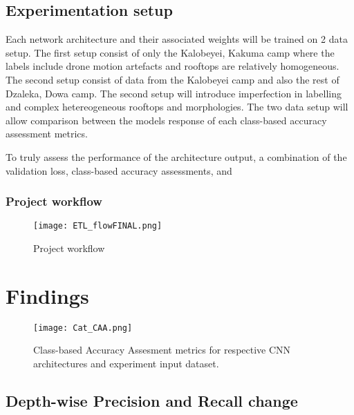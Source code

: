 \documentclass[11pt, a4paper, twoside]{report}
\begin{document}
\section{Experimentation setup}\label{ExpSetup}

Each network architecture and their associated weights will be trained on 2 data setup. The first setup consist of only the Kalobeyei, Kakuma camp where the labels include drone motion artefacts and rooftops are relatively homogeneous. The second setup consist of data from the Kalobeyei camp and also the rest of Dzaleka, Dowa camp. The second setup will introduce imperfection in labelling and complex hetereogeneous rooftops and morphologies. The two data setup will allow comparison between the models response of each class-based accuracy assessment metrics.\\\par

To truly assess the performance of the architecture output, a combination of the validation loss, class-based accuracy assessments, and

\subsection{Project workflow}\label{ProjWorkflow}

\begin{figure}[H]
  \centering
  \texttt{[image: ETL\_flowFINAL.png]}
  \caption{Project workflow}
  \label{fig:ETL_flow}
\end{figure}


\newpage

\chapter{Findings}\label{findings}

\begin{figure}[H]
  \centering
  \texttt{[image: Cat\_CAA.png]}
  \caption{Class-based Accuracy Assesment metrics for respective CNN architectures and experiment input dataset.}
  \label{fig:Cat_CAA}
\end{figure}

\section{Depth-wise Precision and Recall change}
\end{document}
